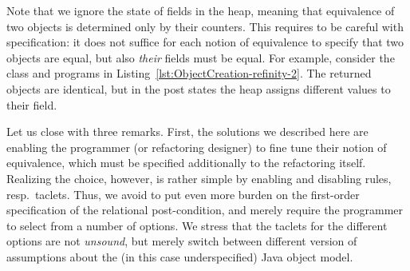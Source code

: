 Note that we ignore the state of fields in the heap, meaning that equivalence of two objects is determined only by their counters. 
This requires to be careful with specification: it does not suffice for each notion of equivalence to specify that two objects are equal, but also \emph{their} fields must be equal.
For example, consider the class and programs in Listing~\ref{lst:ObjectCreation-refinity-2}.
The returned objects are identical, but in the post states the heap assigns different values to their field.



Let us close with three remarks. First, the solutions we described here are enabling the programmer (or refactoring designer) to fine tune their notion of equivalence, which must be specified additionally to the refactoring itself.
Realizing the choice, however, is rather simple by enabling and disabling rules, resp.\ taclets. 
Thus, we avoid to put even more burden on the first-order specification of the relational post-condition, and merely require the programmer to select from a number of options.
We stress that the taclets for the different options are not \emph{unsound}, but merely switch between different version of assumptions about the (in this case underspecified) Java object model.

